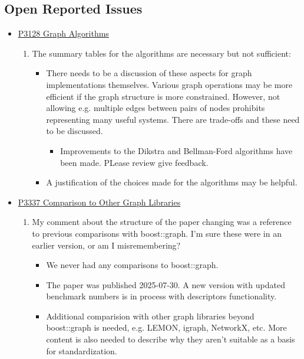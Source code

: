 \subsection{Open Reported Issues}
\begin{itemize}
      \item \href{https://www.wg21.link/P3128}{P3128 Graph Algorithms}
            \begin{enumerate}
                  \item The summary tables for the algorithms are necessary but not sufficient: 
                        \begin{itemize}
                              \item There needs to be a discussion of these aspects for graph implementations themselves. Various graph operations may 
                                    be more efficient if the graph structure is more constrained. However, not allowing e.g. multiple edges between pairs 
                                    of nodes prohibits representing many useful systems. There are trade-offs and these need to be discussed.
                                    \begin{itemize}
                                          \item Improvements to the Dikstra and Bellman-Ford algorithms have been made. PLease review give feedback.
                                    \end{itemize}
                              \item A justification of the choices made for the algorithms may be helpful.
                  \end{itemize}
            \end{enumerate}
      \item \href{https://www.wg21.link/P3337}{P3337 Comparison to Other Graph Libraries}
            \begin{enumerate}
                  \item My comment about the structure of the paper changing was a reference to previous comparisons with boost::graph. 
                        I'm sure these were in an earlier version, or am I misremembering?
                  \begin{itemize}
                        \item We never had any comparisons to boost::graph. 
                        \item The paper was published 2025-07-30. A new version with updated benchmark numbers is in process with descriptors 
                              functionality.
                        \item Additional comparision with other graph libraries beyond boost::graph is needed, e.g. LEMON, igraph, NetworkX, etc. 
                              More content is also needed to describe why they aren't suitable as a basis for standardization.
                  \end{itemize}
            \end{enumerate}
\end{itemize}

